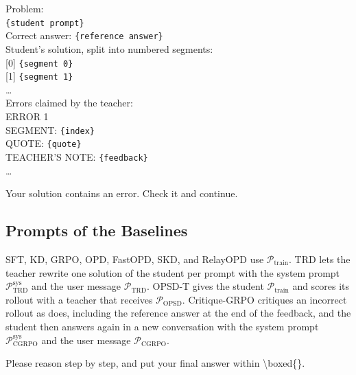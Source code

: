 \begin{prompt}[title={$\mathcal{P}_{\text{judge-user}}$ --- user message of the judge; for a truncated solution, the third line reads ``Student's partial solution (not finished yet), split into numbered segments:''}]
Problem:\\
\texttt{\{student prompt\}}\\[4pt]
Correct answer: \texttt{\{reference answer\}}\\[4pt]
Student's solution, split into numbered segments:\\[4pt]
{[}0{]} \texttt{\{segment 0\}}\\[4pt]
{[}1{]} \texttt{\{segment 1\}}\\[4pt]
\dots\\[4pt]
Errors claimed by the teacher:\\[4pt]
ERROR 1\\
SEGMENT: \texttt{\{index\}}\\
QUOTE: \texttt{\{quote\}}\\
TEACHER'S NOTE: \texttt{\{feedback\}}\\[4pt]
\dots
\end{prompt}

\begin{prompt}[title={$\mathcal{P}_{\text{hint}}$ --- generic hint in Appendix~\ref{app:rewrite-analysis}}]
Your solution contains an error. Check it and continue.
\end{prompt}

\subsection{Prompts of the Baselines}
\label{app:prompts-baselines}

SFT, KD, GRPO, OPD, FastOPD, SKD, and RelayOPD use $\mathcal{P}_{\text{train}}$.
TRD lets the teacher rewrite one solution of the student per prompt with the system prompt $\mathcal{P}_{\text{TRD}}^{\text{sys}}$ and the user message $\mathcal{P}_{\text{TRD}}$.
OPSD-T gives the student $\mathcal{P}_{\text{train}}$ and scores its rollout with a teacher that receives $\mathcal{P}_{\text{OPSD}}$.
Critique-GRPO critiques an incorrect rollout as \ours{} does, including the reference answer at the end of the feedback, and the student then answers again in a new conversation with the system prompt $\mathcal{P}_{\text{CGRPO}}^{\text{sys}}$ and the user message $\mathcal{P}_{\text{CGRPO}}$.

\begin{prompt}[title={$\mathcal{P}_{\text{TRD}}^{\text{sys}}$ --- system prompt of the TRD rewrite}]
Please reason step by step, and put your final answer within \textbackslash{}boxed\{\}.
\end{prompt}

